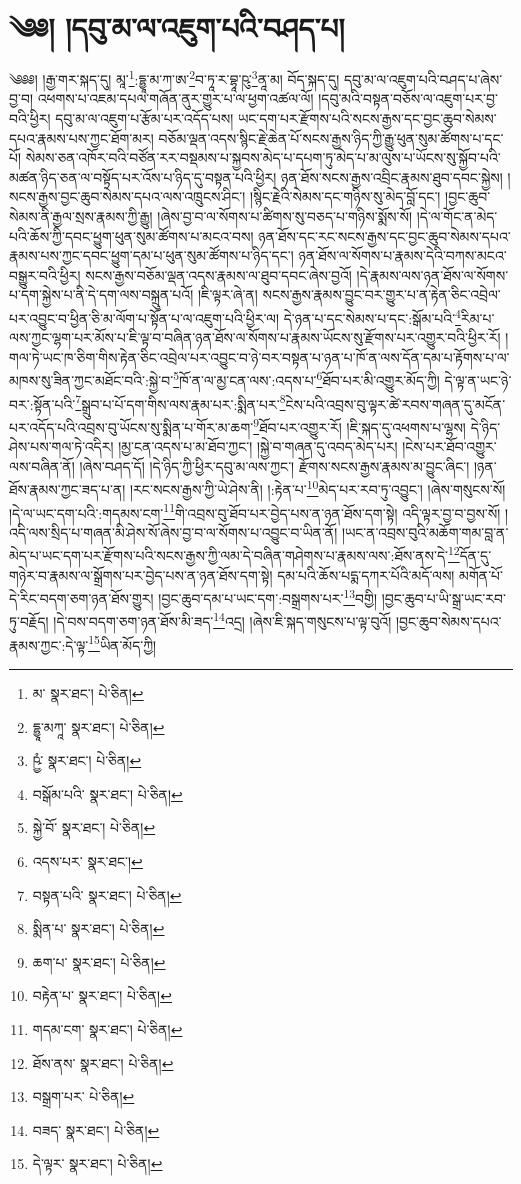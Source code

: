 \setcounter{footnote}{0} 
\chapter{༄༅། །དབུ་མ་ལ་འཇུག་པའི་བཤད་པ།}༄༅༅། །རྒྱ་གར་སྐད་དུ། མཱ་\footnote{མ་  སྣར་ཐང་།  པེ་ཅིན། }:དྷྱཱ་མ་ཀ་ཨ་\footnote{དྷྱཱ་མཀཱ་  སྣར་ཐང་།  པེ་ཅིན། }བ་ཏཱ་ར་བྷཱ་ཥུ་\footnote{ཥྱཾ་  སྣར་ཐང་།  པེ་ཅིན། }ནཱ་མ། བོད་སྐད་དུ། དབུ་མ་ལ་འཇུག་པའི་བཤད་པ་ཞེས་བྱ་བ། འཕགས་པ་འཇམ་དཔལ་གཞོན་ནུར་གྱུར་པ་ལ་ཕྱག་འཚལ་ལོ། །དབུ་མའི་བསྟན་བཅོས་ལ་འཇུག་པར་བྱ་བའི་ཕྱིར། དབུ་མ་ལ་འཇུག་པ་རྩོམ་པར་འདོད་པས། ཡང་དག་པར་རྫོགས་པའི་སངས་རྒྱས་དང་བྱང་ཆུབ་སེམས་དཔའ་རྣམས་པས་ཀྱང་ཐོག་མར། བཅོམ་ལྡན་འདས་སྙིང་རྗེ་ཆེན་པོ་སངས་རྒྱས་ཉིད་ཀྱི་རྒྱུ་ཕུན་སུམ་ཚོགས་པ་དང་པོ། སེམས་ཅན་འཁོར་བའི་བཙོན་རར་བསྡམས་པ་སྐྱབས་མེད་པ་དཔག་ཏུ་མེད་པ་མ་ལུས་པ་ཡོངས་སུ་སྐྱོབ་པའི་མཚན་ཉིད་ཅན་ལ་བསྟོད་པར་འོས་པ་ཉིད་དུ་བསྟན་པའི་ཕྱིར། ཉན་ཐོས་སངས་རྒྱས་འབྲིང་རྣམས་ཐུབ་དབང་སྐྱེས། །སངས་རྒྱས་བྱང་ཆུབ་སེམས་དཔའ་ལས་འཁྲུངས་ཤིང་། །སྙིང་རྗེའི་སེམས་དང་གཉིས་སུ་མེད་བློ་དང་། །བྱང་ཆུབ་སེམས་ནི་རྒྱལ་སྲས་རྣམས་ཀྱི་རྒྱུ། །ཞེས་བྱ་བ་ལ་སོགས་པ་ཚིགས་སུ་བཅད་པ་གཉིས་སྨོས་སོ། །དེ་ལ་གོང་ན་མེད་པའི་ཆོས་ཀྱི་དབང་ཕྱུག་ཕུན་སུམ་ཚོགས་པ་མངའ་བས། ཉན་ཐོས་དང་རང་སངས་རྒྱས་དང་བྱང་ཆུབ་སེམས་དཔའ་རྣམས་པས་ཀྱང་དབང་ཕྱུག་དམ་པ་ཕུན་སུམ་ཚོགས་པ་ཉིད་དང་། ཉན་ཐོས་ལ་སོགས་པ་རྣམས་དེའི་བཀས་མངའ་བསྒྱུར་བའི་ཕྱིར། སངས་རྒྱས་བཅོམ་ལྡན་འདས་རྣམས་ལ་ཐུབ་དབང་ཞེས་བྱའོ། །དེ་རྣམས་ལས་ཉན་ཐོས་ལ་སོགས་པ་དག་སྐྱེས་པ་ནི་དེ་དག་ལས་བསྐྲུན་པའོ། །ཇི་ལྟར་ཞེ་ན། སངས་རྒྱས་རྣམས་བྱུང་བར་གྱུར་པ་ན་རྟེན་ཅིང་འབྲེལ་པར་འབྱུང་བ་ཕྱིན་ཅི་མ་ལོག་པ་སྟོན་པ་ལ་འཇུག་པའི་ཕྱིར་ལ། དེ་ཉན་པ་དང་སེམས་པ་དང་:སྒོམ་པའི་\footnote{བསྒོམ་པའི་  སྣར་ཐང་།  པེ་ཅིན། }རིམ་པ་ལས་ཀྱང་ལྷག་པར་མོས་པ་ཇི་ལྟ་བ་བཞིན་ཉན་ཐོས་ལ་སོགས་པ་རྣམས་ཡོངས་སུ་རྫོགས་པར་འགྱུར་བའི་ཕྱིར་རོ། །གལ་ཏེ་ཡང་ཁ་ཅིག་གིས་རྟེན་ཅིང་འབྲེལ་པར་འབྱུང་བ་ཉེ་བར་བསྟན་པ་ཉན་པ་ཁོ་ན་ལས་དོན་དམ་པ་རྟོགས་པ་ལ་མཁས་སུ་ཟིན་ཀྱང་མཐོང་བའི་:སྐྱེ་བ་\footnote{སྐྱེ་བོ་  སྣར་ཐང་།  པེ་ཅིན། }ཁོ་ན་ལ་མྱ་ངན་ལས་:འདས་པ་\footnote{འདས་པར་  སྣར་ཐང་། }ཐོབ་པར་མི་འགྱུར་མོད་ཀྱི། དེ་ལྟ་ན་ཡང་ཉེ་བར་:སྟོན་པའི་\footnote{བསྟན་པའི་  སྣར་ཐང་།  པེ་ཅིན། }སྒྲུབ་པ་པོ་དག་གིས་ལས་རྣམ་པར་:སྨིན་པར་\footnote{སྨིན་པ་  སྣར་ཐང་།  པེ་ཅིན། }ངེས་པའི་འབྲས་བུ་ལྟར་ཚེ་རབས་གཞན་དུ་མངོན་པར་འདོད་པའི་འབྲས་བུ་ཡོངས་སུ་སྨིན་པ་གོར་མ་ཆག་\footnote{ཆག་པ་  སྣར་ཐང་།  པེ་ཅིན། }ཐོབ་པར་འགྱུར་རོ། །ཇི་སྐད་དུ་འཕགས་པ་ལྷས། དེ་ཉིད་ཤེས་པས་གལ་ཏེ་འདིར། །མྱ་ངན་འདས་པ་མ་ཐོབ་ཀྱང་། །སྐྱེ་བ་གཞན་དུ་འབད་མེད་པར། །ངེས་པར་ཐོབ་འགྱུར་ལས་བཞིན་ནོ། །ཞེས་བཤད་དོ། །དེ་ཉིད་ཀྱི་ཕྱིར་དབུ་མ་ལས་ཀྱང་། རྫོགས་སངས་རྒྱས་རྣམས་མ་བྱུང་ཞིང་། །ཉན་ཐོས་རྣམས་ཀྱང་ཟད་པ་ན། །རང་སངས་རྒྱས་ཀྱི་ཡེ་ཤེས་ནི། །:རྟེན་པ་\footnote{བརྟེན་པ་  སྣར་ཐང་།  པེ་ཅིན། }མེད་པར་རབ་ཏུ་འབྱུང་། །ཞེས་གསུངས་སོ། །དེ་ལ་ཡང་དག་པའི་:གདམས་ངག་\footnote{གདམ་ངག་  སྣར་ཐང་།  པེ་ཅིན། }གི་འབྲས་བུ་ཐོབ་པར་བྱེད་པས་ན་ཉན་ཐོས་དག་སྟེ། འདི་ལྟར་བྱ་བ་བྱས་སོ། །འདི་ལས་སྲིད་པ་གཞན་མི་ཤེས་སོ་ཞེས་བྱ་བ་ལ་སོགས་པ་འབྱུང་བ་ཡིན་ནོ། །ཡང་ན་འབྲས་བུའི་མཆོག་གམ་བླ་ན་མེད་པ་ཡང་དག་པར་རྫོགས་པའི་སངས་རྒྱས་ཀྱི་ལམ་དེ་བཞིན་གཤེགས་པ་རྣམས་ལས་:ཐོས་ནས་དེ་\footnote{ཐོས་ནས་  སྣར་ཐང་།  པེ་ཅིན། }དོན་དུ་གཉེར་བ་རྣམས་ལ་སྒྲོགས་པར་བྱེད་པས་ན་ཉན་ཐོས་དག་སྟེ། དམ་པའི་ཆོས་པདྨ་དཀར་པོའི་མདོ་ལས། མགོན་པོ་དེ་རིང་བདག་ཅག་ཉན་ཐོས་གྱུར། །བྱང་ཆུབ་དམ་པ་ཡང་དག་:བསྒྲགས་པར་\footnote{བསྒྲག་པར་  པེ་ཅིན། }བགྱི། །བྱང་ཆུབ་པ་ཡི་སྒྲ་ཡང་རབ་ཏུ་བརྗོད། །དེ་བས་བདག་ཅག་ཉན་ཐོས་མི་ཟད་\footnote{བཟད་  སྣར་ཐང་།  པེ་ཅིན། }འདྲ། །ཞེས་ཇི་སྐད་གསུངས་པ་ལྟ་བུའོ། །བྱང་ཆུབ་སེམས་དཔའ་རྣམས་ཀྱང་:དེ་ལྟ་\footnote{དེ་ལྟར་  སྣར་ཐང་།  པེ་ཅིན། }ཡིན་མོད་ཀྱི། 